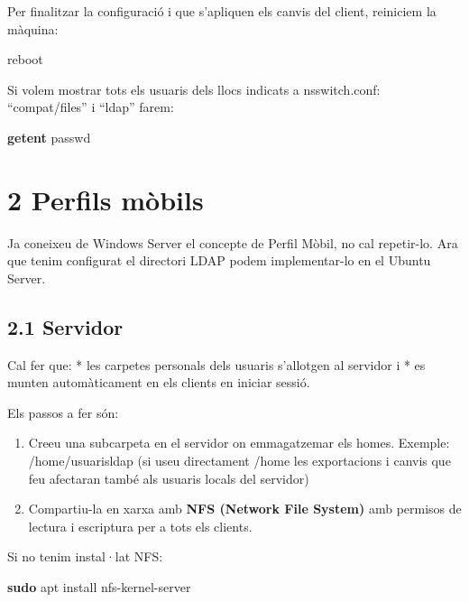 \documentclass[
  12 pt,
  a4paper,
]{article}
\newenvironment{Shaded}{\begin{snugshade}}{\end{snugshade}}
\newcommand{\ExtensionTok}[1]{#1}
\newcommand{\FunctionTok}[1]{\textcolor[rgb]{0.13,0.29,0.53}{\textbf{#1}}}
\newcommand{\NormalTok}[1]{#1}
\begin{document}
Per finalitzar la configuració i que s'apliquen els canvis del client,
reiniciem la màquina:

\begin{Shaded}
\begin{Highlighting}[]
\ExtensionTok{reboot}
\end{Highlighting}
\end{Shaded}

Si volem mostrar tots els usuaris dels llocs indicats a nsswitch.conf:
``compat/files'' i ``ldap'' farem:

\begin{Shaded}
\begin{Highlighting}[]
\FunctionTok{getent}\NormalTok{ passwd}
\end{Highlighting}
\end{Shaded}

\newpage

\section{2 Perfils mòbils}\label{perfils-muxf2bils}

Ja coneixeu de Windows Server el concepte de Perfil Mòbil, no cal
repetir-lo. Ara que tenim configurat el directori LDAP podem
implementar-lo en el Ubuntu Server.

\subsection{2.1 Servidor}\label{servidor}

Cal fer que: * les carpetes personals dels usuaris s'allotgen al
servidor i * es munten automàticament en els clients en iniciar sessió.

Els passos a fer són:

\begin{enumerate}
\def\labelenumi{\arabic{enumi}.}
\item
  Creeu una subcarpeta en el servidor on emmagatzemar els homes.
  Exemple: /home/usuarisldap (si useu directament /home les exportacions
  i canvis que feu afectaran també als usuaris locals del servidor)
\item
  Compartiu-la en xarxa amb \textbf{NFS (Network File System)} amb
  permisos de lectura i escriptura per a tots els clients.
\end{enumerate}

Si no tenim instal·lat NFS:

\begin{Shaded}
\begin{Highlighting}[]
\FunctionTok{sudo}\NormalTok{ apt install nfs{-}kernel{-}server}
\end{Highlighting}
\end{Shaded}
\end{document}
